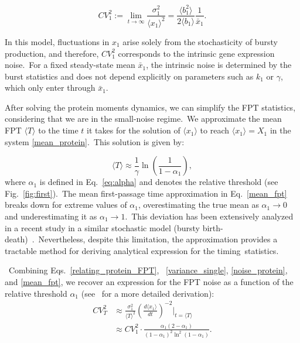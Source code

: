 \documentclass[aps,prb,reprint,superscriptaddress]{revtex4-2}
\begin{document}
\begin{equation}\label{noise_protein}
    CV^2_1  := \lim_{t\rightarrow\infty}\frac{\sigma^2_1}{\langle x_1 \rangle^2} = \frac{\langle b_1^2 \rangle}{2\langle b_1 \rangle}\frac{1}{\bar{x}_1}.
\end{equation}

In this model, fluctuations in \(x_1\) arise solely from the stochasticity of bursty production, and therefore, $CV_1^2$ corresponds to the intrinsic gene expression noise.~For a fixed steady-state mean \(\bar{x}_1\), the intrinsic noise is determined by the burst statistics and does not depend explicitly on parameters such as \(k_1\) or \(\gamma\), which only enter through \(\bar{x}_1\).~


After solving the protein moments dynamics, we can simplify the FPT statistics, considering that we are in the small-noise regime.~We approximate the mean FPT $\langle T\rangle $ to the time $t$ it takes for the solution of $\langle x_1\rangle$ to reach $\langle x_1\rangle=X_1$ in the system \eqref{mean_protein}.~This solution is given by:

\begin{equation}\label{mean_fpt}
    \langle T \rangle \approx \frac{1}{\gamma} \ln{\left(\frac{1}{1 - \alpha_1}\right)},
\end{equation}
where \(\alpha_1\) is defined in Eq.~\eqref{eq:alpha} and denotes the relative threshold (see Fig.~\ref{fig:first}).~The mean first-passage time approximation in Eq.~\eqref{mean_fpt} breaks down for extreme values of \(\alpha_1\), overestimating the true mean as \(\alpha_1 \to 0\) and underestimating it as \(\alpha_1 \to 1\).~This deviation has been extensively analyzed in a recent study in a similar stochastic model (bursty birth-death)~\cite{grima_fpt}.~Nevertheless, despite this limitation, the approximation provides a tractable method for deriving analytical expression for the timing~statistics.

~Combining Eqs.~\eqref{relating_protein_FPT}, ~\eqref{variance_single}, \eqref{noise_protein}, and \eqref{mean_fpt}, we recover an expression for the FPT noise as a function of the relative threshold \( \alpha_1 \) (see~\cite{co2017stochastic, kannoly2020optimum} for a more detailed derivation):
\begin{align}\label{noise_fpt}
    CV_T^2 &\approx \frac{\sigma^2_1}{\langle T\rangle^2} \left( \frac{d \langle x_1 \rangle}{dt} \right)^{-2} \bigg\rvert_{t = \langle T \rangle}\nonumber\\
    &\approx CV_1^2 \cdot \frac{\alpha_1(2 - \alpha_1)}{(1 - \alpha_1)^2 \ln^2(1 - \alpha_1)}.
\end{align}
\end{document}
